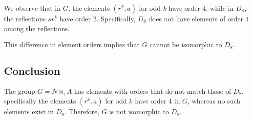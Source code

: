 \documentclass[12pt]{amsart}
\theoremstyle{definition}
\numberwithin{equation}{section}
\begin{document}
\begin{exercise}{5}
    We observe that in \(G\), the elements \((r^k, a)\) for odd \(k\) have order 4, while in \(D_8\), the reflections \(sr^k\) have order 2. Specifically, \(D_8\) does not have elements of order 4 among the reflections. 

    This difference in element orders implies that \(G\) cannot be isomorphic to \(D_8\).

    \subsection*{Conclusion}

    The group \(G = N \rtimes_\gamma A\) has elements with orders that do not match those of \(D_8\), specifically the elements \((r^k, a)\) for odd \(k\) have order 4 in \(G\), whereas no such elements exist in \(D_8\). Therefore, \(G\) is not isomorphic to \(D_8\).
    
    
\end{exercise}
\newpage
\end{document}
